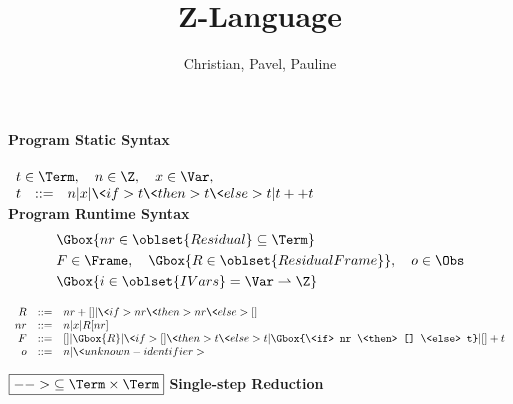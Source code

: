 \documentclass{article}
\title{Z-Language}
\author{Christian, Pavel, Pauline}
\newcommand{\Resid}{\oblset{Residual}}
\newcommand{\ResidFrame}{\oblset{ResidualFrame}}
\newcommand{\IVars}{\oblset{IVars}}
\begin{document}
\maketitle

\noindent\textbf{Program Static Syntax}\\ \\
\begin{math}
  \begin{array}{rcl}
    \multicolumn{3}{l}{
      t \in \Term,\quad
      n \in \Z,\quad
      x \in \Var, \quad
    } \\
    t & ::= & n | x | \<if> t \<then> t \<else> t | t ++ t\\
  \end{array}
\end{math}
\\

\noindent\textbf{Program Runtime Syntax}
%
\begin{align*}
  &\Gbox{nr \in \Resid \subseteq \Term} \\
  &F \in \Frame,\quad \Gbox{R \in \ResidFrame},\quad o \in \Obs \\
  &\Gbox{i \in \IVars = \Var \rightharpoonup \Z}
\end{align*}

\begin{displaymath}
  \begin{array}{rcl}
    R & ::= & nr + [] | \<if> nr \<then> nr \<else> [] \\
    nr & ::= & n | x | R[nr] \\
    F & ::= & [] | \Gbox{R} | \<if> [] \<then> t \<else> t |
    \Gbox{\<if> nr \<then> [] \<else> t} | [] + t \\
    o & ::= & n | \<unknown-identifier>
  \end{array}
\end{displaymath}

\vspace{0.5cm}

$\boxed{{-->} \subseteq \Term \times \Term}$
\quad\textbf{Single-step Reduction}\\

\vspace{0.5cm}
\end{document}
